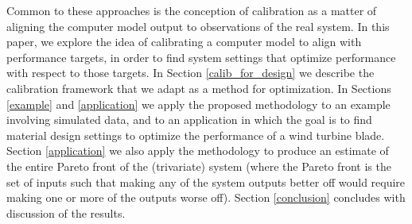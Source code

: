 \documentclass{article}
\begin{document}
%

Common to these approaches is the conception of calibration as a matter of aligning the computer model output to observations of the real system. 
%
In this paper, we explore the idea of calibrating a computer model to align with performance targets, in order to find system settings that optimize performance with respect to those targets.
%
In Section \ref{calib_for_design} we describe the calibration framework that we adapt as a method for optimization. 
%
In Sections \ref{example} and \ref{application} we apply the proposed methodology to an example involving simulated data, and to an application in which the goal is to find material design settings to optimize the performance of a wind turbine blade.
%
Section \ref{application} we also apply the methodology to produce an estimate of the entire Pareto front of the (trivariate) system (where the Pareto front is the set of inputs such that making any of the system outputs better off would require making one or more of the outputs worse off).
%
Section \ref{conclusion} concludes with discussion of the results.
\end{document}
